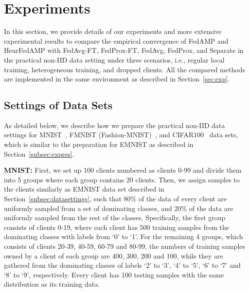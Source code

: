 \section{Experiments} \label{sec:supexp}
In this section, we provide details of our experiments and more extensive experimental results to compare the empirical convergence of FedAMP and HeurFedAMP with FedAvg-FT, FedProx-FT, FedAvg, FedProx, and Separate in the practical non-IID data setting under three scenarios, i.e., regular local training, heterogeneous training, and dropped clients. All the compared methods are implemented in the same environment as described in Section~\ref{sec:exp}.



\subsection{Settings of Data Sets} \label{subsec:supexp-details}
As detailed below, we describe how we prepare the practical non-IID data settings for MNIST~\cite{lecun2010mnist}, FMNIST (Fashion-MNIST)~\cite{xiao2017fashion}, and CIFAR100~\cite{krizhevsky2009learning} data sets, which is similar to the preparation for EMNIST as described in Section~\ref{subsec:expres}.


\textbf{MNIST:} First, we set up 100 clients numbered as clients 0-99 and divide them into 5 groups where each group contains 20 clients. 
Then, we assign samples to the clients similarly as EMNIST data set described in Section~\ref{subsec:datasettings}, such that 80\% of the data of every client are uniformly sampled from a set of dominating classes, and 20\% of the data are uniformly sampled from the rest of the classes.
Specifically, the first group consists of clients 0-19, where each client has 500 training samples from the dominating classes with labels from `0' to `1'.
For the remaining 4 groups, which consists of clients 20-39, 40-59, 60-79 and 80-99, the numbers of training samples owned by a client of each group are 400, 300, 200 and 100, while they are gathered from the dominating classes of labels `2' to `3', `4' to `5', `6' to `7' and `8' to `9', respectively.
Every client has 100 testing samples with the same distribution as its training data.


